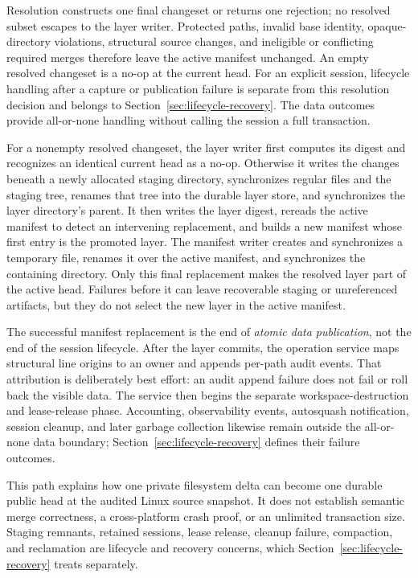 Resolution constructs one final changeset or returns one rejection; no
resolved subset escapes to the layer writer.  Protected paths, invalid base
identity, opaque-directory violations, structural source changes, and
ineligible or conflicting required merges therefore leave the active manifest
unchanged.  An empty resolved changeset is a no-op at the current head.  For an
explicit session, lifecycle handling after a capture or publication failure is
separate from this resolution decision and belongs to
Section~\ref{sec:lifecycle-recovery}.  The data outcomes provide all-or-none
handling without calling the session a full transaction.

For a nonempty resolved changeset, the layer writer first computes its digest
and recognizes an identical current head as a no-op.  Otherwise it writes the
changes beneath a newly allocated staging directory, synchronizes regular
files and the staging tree, renames that tree into the durable layer store, and
synchronizes the layer directory's parent.  It then writes the layer digest,
rereads the active manifest to detect an intervening replacement, and builds a
new manifest whose first entry is the promoted layer.  The manifest writer
creates and synchronizes a temporary file, renames it over the active manifest,
and synchronizes the containing directory.  Only this final replacement makes
the resolved layer part of the active head.  Failures before it can leave
recoverable staging or unreferenced artifacts, but they do not select the new
layer in the active manifest.

The successful manifest replacement is the end of \emph{atomic data
publication}, not the end of the session lifecycle.  After the layer commits,
the operation service maps structural line origins to an owner and appends
per-path audit events.  That attribution is deliberately best effort: an audit
append failure does not fail or roll back the visible data.  The service then
begins the separate workspace-destruction and lease-release phase.  Accounting,
observability events, autosquash notification, session cleanup, and later
garbage collection likewise remain outside the all-or-none data boundary;
Section~\ref{sec:lifecycle-recovery} defines their failure outcomes.

This path explains how one private filesystem delta can become one durable
public head at the audited Linux source snapshot. It does not establish
semantic merge correctness, a cross-platform crash proof, or an unlimited
transaction size. Staging remnants, retained sessions, lease release, cleanup
failure, compaction, and reclamation are lifecycle and recovery concerns,
which Section~\ref{sec:lifecycle-recovery} treats separately.

\clearpage
